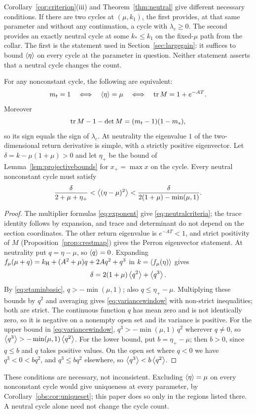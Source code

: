 \begin{remark}\label{obs:rem:twoways}
Corollary~\ref{cor:criterion}(iii) and Theorem~\ref{thm:neutral} give different necessary conditions. If there are two cycles at $(\mu,k_1)$, the first provides, at that same parameter and without any continuation, a cycle with $\lambda_c\ge0$. The second provides an exactly neutral cycle at some $k_*\le k_1$ on the fixed-$\mu$ path from the collar. The first is the statement used in Section~\ref{sec:largegain}: it suffices to bound $\left\langle \eta\right\rangle$ on every cycle at the parameter in question. Neither statement asserts that a neutral cycle changes the count.
\end{remark}

\begin{corollary}\label{cor:neutralconditions}
For any nonconstant cycle, the following are equivalent:
\begin{equation}\label{eq:neutralcriteria}
m_t=1\quad\Longleftrightarrow\quad\left\langle \eta\right\rangle=\mu
\quad\Longleftrightarrow\quad\operatorname{tr} M=1+e^{-AT}.
\end{equation}
Moreover
\[
\operatorname{tr} M-1-\det M=(m_t-1)(1-m_s),
\]
so its sign equals the sign of $\lambda_c$. At neutrality the eigenvalue $1$ of the two-dimensional return derivative is simple, with a strictly positive eigenvector.
Let $\delta=k-\mu(1+\mu)>0$ and let $\eta_+$ be the bound of Lemma~\ref{lem:projectivebounds} for $x_+=\max x$ on the cycle. Every neutral nonconstant cycle must satisfy
\begin{equation}\label{eq:variancewindow}
\frac{\delta}{2+\mu+\eta_+}
<\left\langle (\eta-\mu)^2\right\rangle
<\frac{\delta}{2(1+\mu)-\min(\mu,1)}.
\end{equation}
\end{corollary}
\begin{proof}
The multiplier formulas \eqref{eq:exponent} give \eqref{eq:neutralcriteria}; the trace identity follows by expansion, and trace and determinant do not depend on the section coordinates. The other return eigenvalue is $e^{-AT}<1$, and strict positivity of $M$ (Proposition~\ref{prop:crestmap}) gives the Perron eigenvector statement.
At neutrality put $q=\eta-\mu$, so $\left\langle q\right\rangle=0$. Expanding $f_\mu(\mu+q)=k_{\mathrm H}+(A^2+\mu)q+2Aq^2+q^3$ in $k=\left\langle f_\mu(\eta)\right\rangle$ gives
\[
\delta=2(1+\mu)\left\langle q^2\right\rangle+\left\langle q^3\right\rangle.
\]
By \eqref{eq:etaminbasic}, $q>-\min(\mu,1)$; also $q\le\eta_+-\mu$. Multiplying these bounds by $q^2$ and averaging gives \eqref{eq:variancewindow} with non-strict inequalities; both are strict. The continuous function $q$ has mean zero and is not identically zero, so it is negative on a nonempty open set and its variance is positive. For the upper bound in \eqref{eq:variancewindow}, $q^3>-\min(\mu,1)\,q^2$ wherever $q\ne0$, so $\left\langle q^3\right\rangle>-\min(\mu,1)\left\langle q^2\right\rangle$. For the lower bound, put $b=\eta_+-\mu$; then $b>0$, since $q\le b$ and $q$ takes positive values. On the open set where $q<0$ we have $q^3<0<bq^2$, and $q^3\le bq^2$ elsewhere, so $\left\langle q^3\right\rangle<b\left\langle q^2\right\rangle$.
\end{proof}
These conditions are necessary, not inconsistent. Excluding $\left\langle \eta\right\rangle=\mu$ on every nonconstant cycle would give uniqueness at every parameter, by Corollary~\ref{obs:cor:uniqueset}; this paper does so only in the regions listed there. A neutral cycle alone need not change the cycle count.
